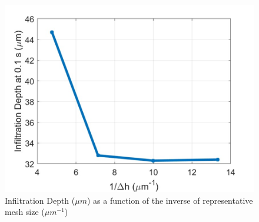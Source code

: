 \documentclass{UCF_ETD}
\begin{document}

\begin{figure}
    \centering
    \includegraphics[width=\linewidth]{Figures/infilDepthMesh.png}
    \caption{Infiltration Depth ($\mu m$) as a function of the inverse of representative mesh size ($\mu m ^{-1}$)}
    \label{fig:meshSensResults}
\end{figure}
\end{document}
